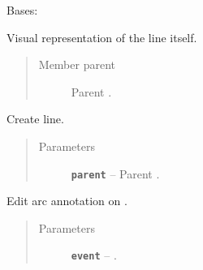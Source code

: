 \documentclass[a4paper,10pt,english]{sphinxmanual}
\begin{document}
\begin{fulllineitems}
\begin{fulllineitems}
\begin{quote}
\begin{description}
\end{description}\end{quote}

\end{fulllineitems}


\end{fulllineitems}


\begin{fulllineitems}
\label{model_link:model.ArcItem.LineItem}
Bases: 

Visual representation of the line itself.
\begin{quote}\begin{description}
\item[{Member parent}] \leavevmode
Parent .

\end{description}\end{quote}

\begin{fulllineitems}
\label{model_link:model.ArcItem.LineItem.__init__}
Create line.
\begin{quote}\begin{description}
\item[{Parameters}] \leavevmode
\textbf{\texttt{parent}} -- Parent .

\end{description}\end{quote}

\end{fulllineitems}


\begin{fulllineitems}
\label{model_link:model.ArcItem.LineItem.mouseDoubleClickEvent}
Edit arc annotation on .
\begin{quote}\begin{description}
\item[{Parameters}] \leavevmode
\textbf{\texttt{event}} -- .

\end{description}\end{quote}

\end{fulllineitems}


\end{fulllineitems}
\end{document}

